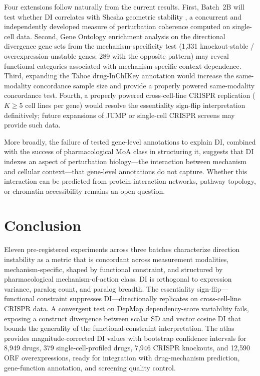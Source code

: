 \documentclass[11pt]{article}
\begin{document}
Four extensions follow naturally from the current results.  First,
Batch~2B will test whether DI correlates with Shesha geometric
stability \citep{raju2026a, raju2026b}, a concurrent and independently
developed measure of perturbation coherence computed on single-cell
data.  Second, Gene Ontology enrichment analysis on the directional
divergence gene sets from the mechanism-specificity test (1{,}331 knockout-stable /
overexpression-unstable genes; 289 with the opposite pattern) may reveal
functional categories associated with mechanism-specific
context-dependence.  Third, expanding the Tahoe drug-InChIKey
annotation would increase the same-modality concordance sample size and provide a properly
powered same-modality concordance test.  Fourth, a properly powered
cross-cell-line CRISPR replication ($K \geq 5$ cell lines per gene)
would resolve the essentiality sign-flip interpretation definitively;
future expansions of JUMP or single-cell CRISPR screens
\citep{tahoe2025} may provide such data.

More broadly, the failure of tested gene-level annotations to
explain DI, combined with the success of pharmacological MoA class in
structuring it, suggests that DI indexes an aspect of perturbation
biology---the interaction between mechanism and cellular
context---that gene-level annotations do not capture.  Whether this
interaction can be predicted from protein interaction networks, pathway
topology, or chromatin accessibility remains an open question.

\section{Conclusion}

Eleven pre-registered experiments across three batches characterize
direction instability as a metric that is concordant across measurement
modalities, mechanism-specific, shaped by functional constraint, and
structured by pharmacological mechanism-of-action class.  DI is
orthogonal to expression variance, paralog count, and paralog
breadth.  The essentiality sign-flip---functional constraint suppresses
DI---directionally replicates on cross-cell-line CRISPR data.  A
convergent test on DepMap dependency-score variability fails, exposing a
construct divergence between scalar SD and vector cosine DI that
bounds the generality of the functional-constraint interpretation.  The
atlas provides magnitude-corrected DI values with bootstrap confidence
intervals for 8{,}949 drugs, 379 single-cell-profiled drugs, 7{,}946
CRISPR knockouts, and 12{,}590 ORF overexpressions, ready for
integration with drug-mechanism prediction, gene-function annotation,
and screening quality control.
\end{document}
